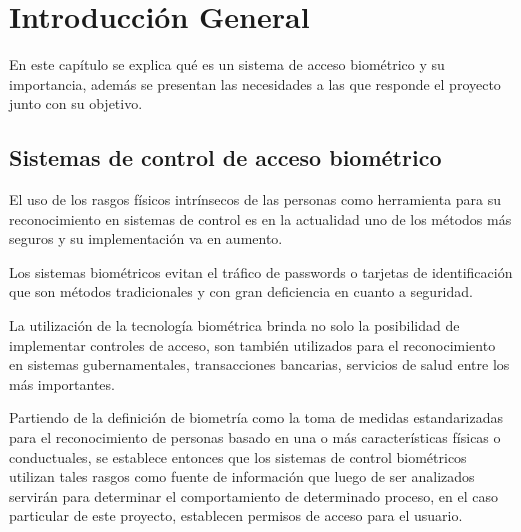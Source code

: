 
\chapter{Introducción General} %

\label{Chapter1} %
\label{IntroGeneral}
En este capítulo se explica qué es un sistema de acceso biométrico y su importancia, además se presentan las necesidades a las que responde el proyecto junto con su objetivo.

\newcommand{\keyword}[1]{\textbf{#1}}
\newcommand{\tabhead}[1]{\textbf{#1}}
\newcommand{\code}[1]{\texttt{#1}}
\newcommand{\file}[1]{\texttt{\bfseries#1}}
\newcommand{\option}[1]{\texttt{\itshape#1}}
\newcommand{\grados}{$^{\circ}$}



\section{Sistemas de control de acceso biométrico}
El uso de los rasgos físicos intrínsecos de las personas como herramienta para su reconocimiento
en sistemas de control es en la actualidad uno de los métodos más seguros y su implementación
va en aumento. 

Los sistemas biométricos evitan el tráfico de passwords o tarjetas de
identificación que son métodos tradicionales y con gran deficiencia en cuanto a seguridad.

La utilización de la tecnología biométrica brinda no solo la posibilidad de implementar controles
de acceso, son también utilizados para el reconocimiento en sistemas gubernamentales,
transacciones bancarias, servicios de salud entre los más importantes.

Partiendo de la definición de biometría como la toma de medidas estandarizadas para el reconocimiento de personas basado en una o más características físicas o conductuales, se establece entonces que los sistemas de control biométricos utilizan tales rasgos como fuente de información que luego de ser analizados servirán para determinar el comportamiento de determinado proceso, en el caso particular de este proyecto, establecen permisos de acceso para el usuario.

